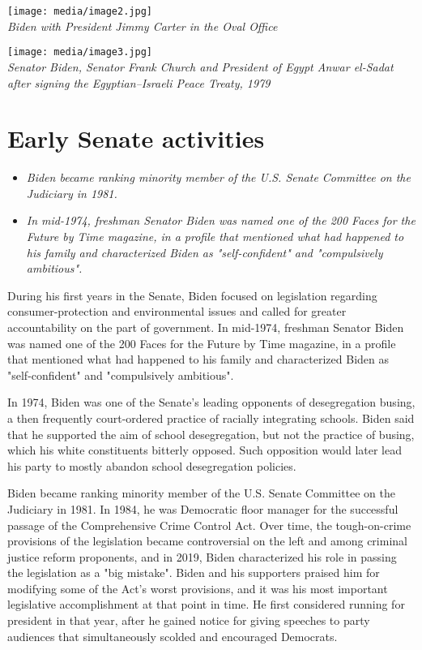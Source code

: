\texttt{[image: media/image2.jpg]}\\
\emph{Biden with President Jimmy Carter in the Oval Office}

\texttt{[image: media/image3.jpg]}\\
\emph{Senator Biden, Senator Frank Church and President of Egypt Anwar
el-Sadat after signing the Egyptian--Israeli Peace Treaty, 1979}

\section{Early Senate activities}\label{early-senate-activities}

\begin{itemize}
\item
  \emph{Biden became ranking minority member of the U.S. Senate
  Committee on the Judiciary in 1981.}
\item
  \emph{In mid-1974, freshman Senator Biden was named one of the 200
  Faces for the Future by Time magazine, in a profile that mentioned
  what had happened to his family and characterized Biden as
  "self-confident" and "compulsively ambitious".}
\end{itemize}

During his first years in the Senate, Biden focused on legislation
regarding consumer-protection and environmental issues and called for
greater accountability on the part of government. In mid-1974, freshman
Senator Biden was named one of the 200 Faces for the Future by Time
magazine, in a profile that mentioned what had happened to his family
and characterized Biden as "self-confident" and "compulsively
ambitious".

In 1974, Biden was one of the Senate's leading opponents of
desegregation busing, a then frequently court-ordered practice of
racially integrating schools. Biden said that he supported the aim of
school desegregation, but not the practice of busing, which his white
constituents bitterly opposed. Such opposition would later lead his
party to mostly abandon school desegregation policies.

Biden became ranking minority member of the U.S. Senate Committee on the
Judiciary in 1981. In 1984, he was Democratic floor manager for the
successful passage of the Comprehensive Crime Control Act. Over time,
the tough-on-crime provisions of the legislation became controversial on
the left and among criminal justice reform proponents, and in 2019,
Biden characterized his role in passing the legislation as a "big
mistake". Biden and his supporters praised him for modifying some of the
Act's worst provisions, and it was his most important legislative
accomplishment at that point in time. He first considered running for
president in that year, after he gained notice for giving speeches to
party audiences that simultaneously scolded and encouraged Democrats.

